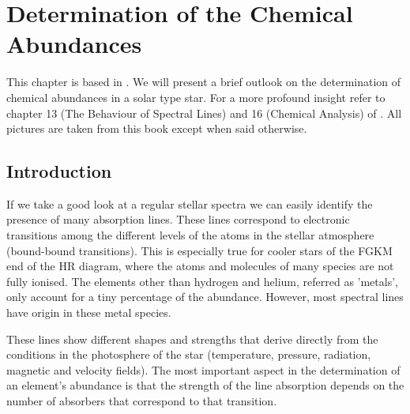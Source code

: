 \documentclass[dvips,12pt,a4paper]{report}
\begin{document}
{%




\chapter{Determination of the Chemical Abundances}

\indent This chapter is based in \citet{Gray-2005}. We will present a brief outlook on the determination of chemical abundances in a solar type star. For a more profound insight refer to chapter 13 (The Behaviour of Spectral Lines) and 16 (Chemical Analysis) of \citet{Gray-2005}. All pictures are taken from this book except when said otherwise.

\section{Introduction}

If we take a good look at a regular stellar spectra we can easily identify the presence of many absorption lines. These lines correspond to electronic transitions among the different levels of the atoms in the stellar atmosphere (bound-bound transitions). This is especially true for cooler stars of the FGKM end of the HR diagram, where the atoms and molecules of many species are not fully ionised. %
The elements other than hydrogen and helium, referred as 'metals', only account for a tiny percentage of the abundance. However, most spectral lines have origin in these metal species.

These lines show different shapes and strengths that derive directly from the conditions in the photosphere of the star (temperature, pressure, radiation, magnetic and velocity fields). %
The most important aspect in the determination of an element's abundance is that the strength of the line absorption depends on the number of absorbers that correspond to that transition.

}
\end{document}
